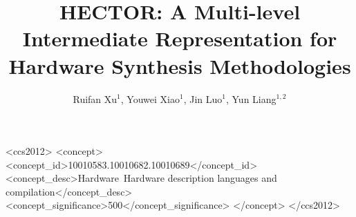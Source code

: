 \documentclass[sigconf]{acmart}
\begin{document}

\title{HECTOR: A Multi-level Intermediate Representation for Hardware Synthesis Methodologies}






\author{Ruifan Xu$^1$, Youwei Xiao$^1$, Jin Luo$^1$, Yun Liang$^{1,2}$}



\begin{CCSXML}
<ccs2012>
   <concept>
       <concept_id>10010583.10010682.10010689</concept_id>
       <concept_desc>Hardware~Hardware description languages and compilation</concept_desc>
       <concept_significance>500</concept_significance>
       </concept>
 </ccs2012>
\end{CCSXML}
\end{document}
